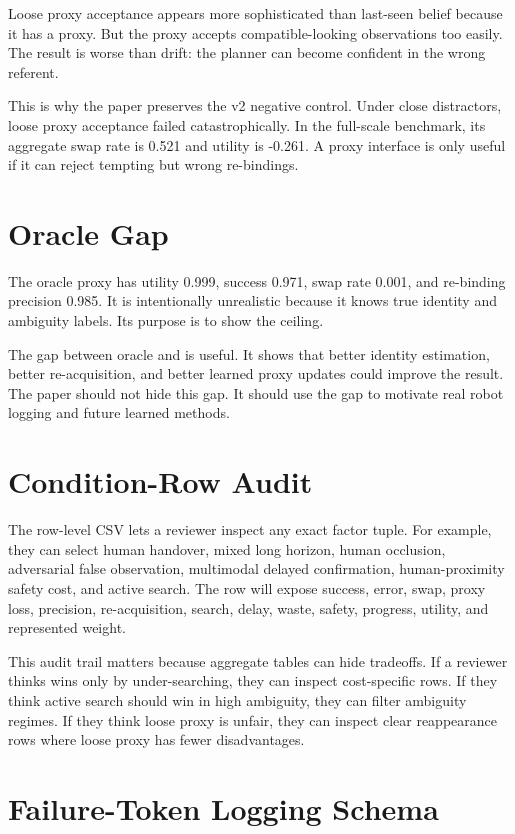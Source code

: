 Loose proxy acceptance appears more sophisticated than last-seen belief because it has a proxy. But the proxy accepts compatible-looking observations too easily. The result is worse than drift: the planner can become confident in the wrong referent.

This is why the paper preserves the v2 negative control. Under close distractors, loose proxy acceptance failed catastrophically. In the full-scale benchmark, its aggregate swap rate is 0.521 and utility is -0.261. A proxy interface is only useful if it can reject tempting but wrong re-bindings.

\section{Oracle Gap}

The oracle proxy has utility 0.999, success 0.971, swap rate 0.001, and re-binding precision 0.985. It is intentionally unrealistic because it knows true identity and ambiguity labels. Its purpose is to show the ceiling.

The gap between oracle and \method is useful. It shows that better identity estimation, better re-acquisition, and better learned proxy updates could improve the result. The paper should not hide this gap. It should use the gap to motivate real robot logging and future learned methods.

\section{Condition-Row Audit}

The row-level CSV lets a reviewer inspect any exact factor tuple. For example, they can select human handover, mixed long horizon, human occlusion, adversarial false observation, multimodal delayed confirmation, human-proximity safety cost, and active search. The row will expose success, error, swap, proxy loss, precision, re-acquisition, search, delay, waste, safety, progress, utility, and represented weight.

This audit trail matters because aggregate tables can hide tradeoffs. If a reviewer thinks \method wins only by under-searching, they can inspect cost-specific rows. If they think active search should win in high ambiguity, they can filter ambiguity regimes. If they think loose proxy is unfair, they can inspect clear reappearance rows where loose proxy has fewer disadvantages.

\section{Failure-Token Logging Schema}

